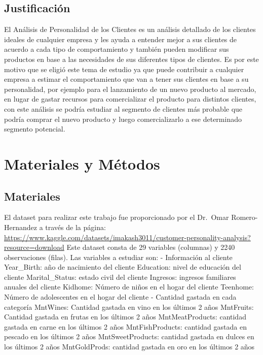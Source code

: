 \documentclass[Iberoamerican Journal of Industrial
Engineering,article,submit,moreauthors,pdftex]{Definitions/mdpi}
\begin{document}
\hypertarget{justificaciuxf3n}{%
\subsection{Justificación}\label{justificaciuxf3n}}

El Análisis de Personalidad de los Clientes es un análisis detallado de
los clientes ideales de cualquier empresa y les ayuda a entender mejor a
sus clientes de acuerdo a cada tipo de comportamiento y también pueden
modificar sus productos en base a las necesidades de sus diferentes
tipos de clientes. Es por este motivo que se eligió este tema de estudio
ya que puede contribuir a cualquier empresa a estimar el comportamiento
que van a tener sus clientes en base a su personalidad, por ejemplo para
el lanzamiento de un nuevo producto al mercado, en lugar de gastar
recursos para comercializar el producto para distintos clientes, con
este análisis se podría estudiar al segmento de clientes más probable
que podría comprar el nuevo producto y luego comercializarlo a ese
determinado segmento potencial.

\hypertarget{materiales-y-muxe9todos}{%
\section{Materiales y Métodos}\label{materiales-y-muxe9todos}}

\hypertarget{materiales}{%
\subsection{Materiales}\label{materiales}}

El dataset para realizar este trabajo fue proporcionado por el Dr.~Omar
Romero-Hernandez a través de la página:
\url{https://www.kaggle.com/datasets/imakash3011/customer-personality-analysis?resource=download}
Este dataset consta de 29 variables (columnas) y 2240 observaciones
(filas). Las variables a estudiar son: - Información al cliente
Year\_Birth: año de nacimiento del cliente Education: nivel de educación
del cliente Marital\_Status: estado civil del cliente Ingresos: ingresos
familiares anuales del cliente Kidhome: Número de niños en el hogar del
cliente Teenhome: Número de adolescentes en el hogar del cliente -
Cantidad gastada en cada categoría MntWines: Cantidad gastada en vino en
los últimos 2 años MntFruits: Cantidad gastada en frutas en los últimos
2 años MntMeatProducts: cantidad gastada en carne en los últimos 2 años
MntFishProducts: cantidad gastada en pescado en los últimos 2 años
MntSweetProducts: cantidad gastada en dulces en los últimos 2 años
MntGoldProds: cantidad gastada en oro en los últimos 2 años
\end{document}
